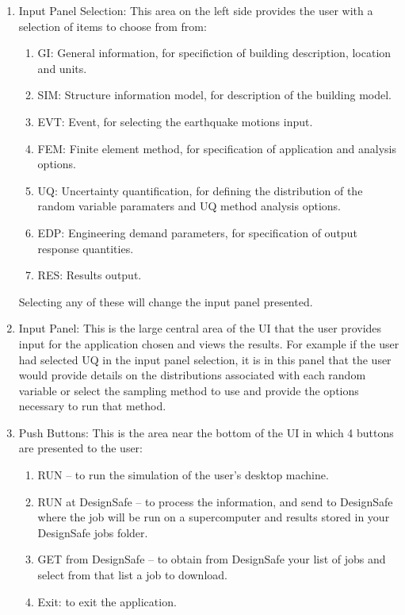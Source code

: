 \begin{enumerate}
\item Input Panel Selection: This area on the left side provides the
  user with a selection of items to choose from from:
\begin{enumerate}
  \item GI: General information, for specifiction of building
    description, location and units.
  \item SIM: Structure information model, for description of the
    building model.
  \item EVT: Event, for selecting the earthquake motions input.
  \item FEM: Finite element method, for specification of application
    and analysis options.
  \item UQ: Uncertainty quantification, for defining the distribution
    of the random variable paramaters and UQ method analysis options.
  \item EDP: Engineering demand parameters, for specification of
    output response quantities.
  \item RES: Results output.
\end{enumerate}

Selecting any of these will change the input panel presented.

\item Input Panel: This is the large central area of the UI that the
  user provides input for the application chosen and views the
  results. For example if the user had selected UQ in the input panel
  selection, it is in this panel that the user would provide details
  on the distributions associated with each random variable or select
  the sampling method to use and provide the options necessary to run
  that method.

\item Push Buttons: This is the area near the bottom of the UI in
  which 4 buttons are presented to the user:

\begin{enumerate}
\item RUN – to run the simulation of the user’s desktop machine.
\item RUN at DesignSafe – to process the information, and send to
  DesignSafe where the job will be run on a supercomputer and results
  stored in your DesignSafe jobs folder.
\item GET from DesignSafe – to obtain from DesignSafe your list of
  jobs and select from that list a job to download.
\item Exit: to exit the application.
\end{enumerate}


\end{enumerate}
